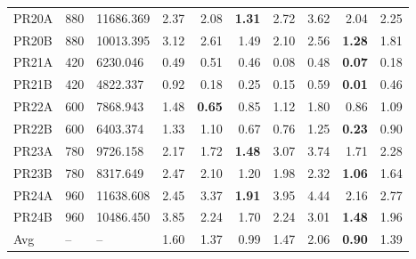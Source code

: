 \begin{tabular}{@{}lllrrrrrrr@{}}
PR20A & 880 & 11686.369 & 2.37 & 2.08 & \textbf{1.31} & 2.72 & 3.62 & 2.04 & 2.25 \\
PR20B & 880 & 10013.395 & 3.12 & 2.61 & 1.49 & 2.10 & 2.56 & \textbf{1.28} & 1.81 \\
PR21A & 420 & 6230.046 & 0.49 & 0.51 & 0.46 & 0.08 & 0.48 & \textbf{0.07} & 0.18 \\
PR21B & 420 & 4822.337 & 0.92 & 0.18 & 0.25 & 0.15 & 0.59 & \textbf{0.01} & 0.46 \\
PR22A & 600 & 7868.943 & 1.48 & \textbf{0.65} & 0.85 & 1.12 & 1.80 & 0.86 & 1.09 \\
PR22B & 600 & 6403.374 & 1.33 & 1.10 & 0.67 & 0.76 & 1.25 & \textbf{0.23} & 0.90 \\
PR23A & 780 & 9726.158 & 2.17 & 1.72 & \textbf{1.48} & 3.07 & 3.74 & 1.71 & 2.28 \\
PR23B & 780 & 8317.649 & 2.47 & 2.10 & 1.20 & 1.98 & 2.32 & \textbf{1.06} & 1.64 \\
PR24A & 960 & 11638.608 & 2.45 & 3.37 & \textbf{1.91} & 3.95 & 4.44 & 2.16 & 2.77 \\
PR24B & 960 & 10486.450 & 3.85 & 2.24 & 1.70 & 2.24 & 3.01 & \textbf{1.48} & 1.96 \\
Avg & -- & -- & 1.60 & 1.37 & 0.99 & 1.47 & 2.06 & \textbf{0.90} & 1.39 \\
\bottomrule
\end{tabular}
